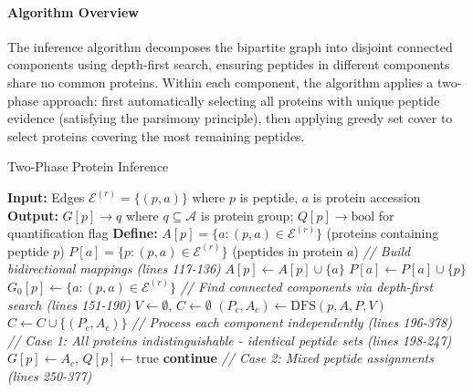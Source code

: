 \documentclass[pdflatex,sn-nature]{sn-jnl}
\begin{document}
\paragraph{Algorithm Overview} The inference algorithm decomposes the bipartite graph into disjoint connected components using depth-first search, ensuring peptides in different components share no common proteins. Within each component, the algorithm applies a two-phase approach: first automatically selecting all proteins with unique peptide evidence (satisfying the parsimony principle), then applying greedy set cover to select proteins covering the most remaining peptides.

\begin{algorithm}[H]
\caption{Two-Phase Protein Inference}
\begin{algorithmic}[1]
\State \textbf{Input:} Edges $\mathcal{E}^{(r)} = \{(p, a)\}$ where $p$ is peptide, $a$ is protein accession
\State \textbf{Output:} $G[p] \to q$ where $q \subseteq \mathcal{A}$ is protein group; $Q[p] \to \text{bool}$ for quantification flag
\State \textbf{Define:} $A[p] = \{a : (p, a) \in \mathcal{E}^{(r)}\}$ (proteins containing peptide $p$)
\State \hspace{2.3em} $P[a] = \{p : (p, a) \in \mathcal{E}^{(r)}\}$ (peptides in protein $a$)
\State
\State \textit{// Build bidirectional mappings (lines 117-136)}
    \State $A[p] \gets A[p] \cup \{a\}$ 
    \State $P[a] \gets P[a] \cup \{p\}$ 
    \State $G_0[p] \gets \{a : (p, a) \in \mathcal{E}^{(r)}\}$ 
\EndFor
\State
\State \textit{// Find connected components via depth-first search (lines 151-190)}
\State $V \gets \emptyset$, $C \gets \emptyset$ 
        \State $(P_c, A_c) \gets \text{DFS}(p, A, P, V)$ 
        \State $C \gets C \cup \{(P_c, A_c)\}$
    \EndIf
\EndFor
\State
\State \textit{// Process each component independently (lines 196-378)}
    \State
    \State \textit{// Case 1: All proteins indistinguishable - identical peptide sets (lines 198-247)}
            \State $G[p] \gets A_c$, $Q[p] \gets \text{true}$ 
        \EndFor
        \State \textbf{continue}
    \EndIf
    \State
    \State \textit{// Case 2: Mixed peptide assignments (lines 250-377)}

\end{algorithmic}
\end{algorithm}
\end{document}
